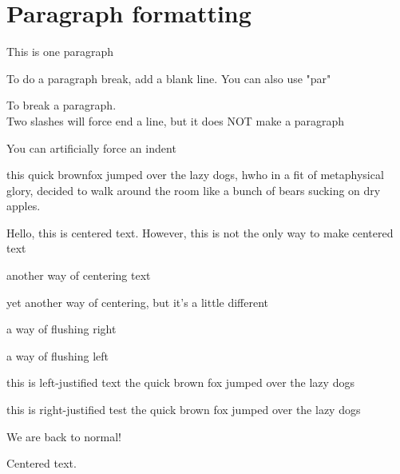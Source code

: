 \documentclass[12pt]{report}
\begin{document}
\chapter{Paragraph formatting}
\setlength{\parindent}{10ex} %
\setlength{\parskip}{1em} %


This is one paragraph 

To do a paragraph break, add a blank line. You can also use "par"\par 
To break a paragraph.\\ 
Two slashes will force end a line, but it does NOT make a paragraph 

\indent \indent You can artificially force an indent 

this quick brownfox jumped over the lazy dogs, hwho in a fit of metaphysical glory, decided to walk around the room like a bunch of bears sucking on dry apples. 

\begin{center}
Hello, this is centered text. However, this is not the only way to make centered text
\end{center}


{ \centering another way of centering text %
 
}

{\hfill yet another way of centering, but it's a little different \hfill}

{\hfill a way of flushing right}

{a way of flushing left\hfill }


\begin{flushleft}
this is left-justified text the quick brown fox jumped over the lazy dogs 
\end{flushleft}

\begin{flushright}
this is right-justified test the quick brown fox jumped over the lazy dogs 
\end{flushright}

We are back to normal! 

\pagebreak
\hspace{0pt} %
\vfill
Centered text.
\vfill
\hspace{0pt}
\pagebreak
\end{document}
